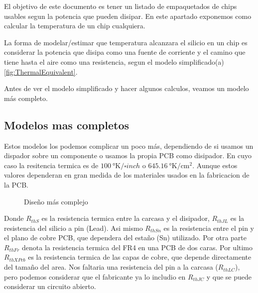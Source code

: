 El objetivo de este documento es tener un listado de empaquetados de chips usables segun
la potencia que pueden disipar. En este apartado exponemos como calcular la temperatura de un
chip cualquiera.

La forma de modelar/estimar que temperatura alcanzara el silicio en un chip es considerar
la potencia que disipa como una fuente de corriente y el camino que tiene hasta el aire como
una resistencia, segun el modelo simplificado(a)\ref{fig:ThermalEquivalent}.

Antes de ver el modelo simplificado y hacer algunos calculos, veamos un modelo más completo.

\subsection{Modelos mas completos}
Estos modelos los podemos complicar un poco más, dependiendo de si usamos un dispador sobre un componente o 
usamos la propia PCB como disipador. En cuyo caso la resitencia termica es
de $\SI{100}{\degree\kelvin/\square{inch}}$ o $\SI{645.16}{\degree\kelvin/\square\cm}$.
Aunque estos valores dependeran en gran medida de los materiales usados en la 
fabricacion de la PCB.


\begin{figure}[H]
    \centering
    
    \caption{Diseño más complejo}
    \label{fig:ThermalEquivFull}
\end{figure}

Donde $R_{thS}$ es la resistencia termica entre la carcasa y el disipador, $R_{thJL}$ es la
resistencia del silicio a pin (Lead). Asi mismo $R_{thSn}$ es la resistencia entre el pin
y el plano de cobre PCB, que dependera del estaño (Sn) utilizado. Por otra parte $R_{thFr}$
denota la resistencia termica del FR4 en una PCB de dos caras. Por ultimo $R_{thXPcb}$ es la
resistencia termica de las capas de cobre, que depende directamente del tamaño del area.
Nos faltaria una resistencia del pin a la carcasa ($R_{thLC}$), pero podemos considerar que el fabricante ya lo includio en $R_{thJC}$ y que se puede considerar un circuito abierto.

